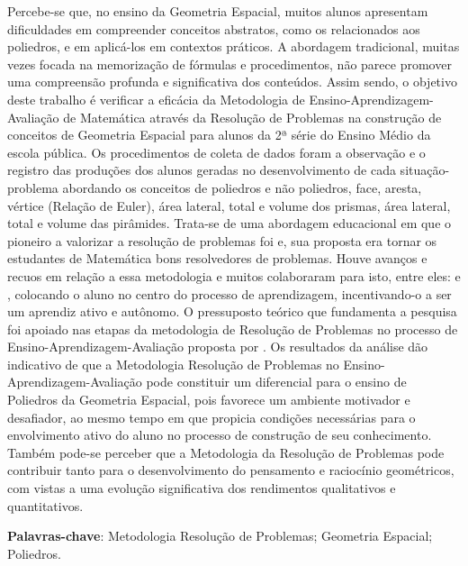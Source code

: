 
\setlength{\absparsep}{18pt} %
\begin{resumo}

	Percebe-se que, no ensino da Geometria Espacial, muitos alunos apresentam dificuldades em compreender conceitos abstratos, como os relacionados aos poliedros, e em aplicá-los em contextos práticos. A abordagem tradicional, muitas vezes focada na memorização de fórmulas e procedimentos, não parece promover uma compreensão profunda e significativa dos conteúdos. Assim sendo, o objetivo deste trabalho é verificar a eficácia da Metodologia de Ensino-Aprendizagem-Avaliação de Matemática através da Resolução de Problemas na construção de conceitos de Geometria Espacial para alunos da 2ª série do Ensino Médio da escola pública. Os procedimentos de coleta de dados foram a observação e o registro das produções dos alunos geradas no desenvolvimento de cada situação-problema abordando os conceitos de poliedros e não poliedros, face, aresta, vértice (Relação de Euler), área lateral, total e volume dos prismas, área lateral, total e volume das pirâmides. Trata-se de uma abordagem educacional em que o pioneiro a valorizar a resolução de problemas foi  e, sua proposta era tornar os estudantes de Matemática bons resolvedores de problemas. Houve avanços e recuos em relação a essa metodologia e muitos colaboraram para isto, entre eles:  e , colocando o aluno no centro do processo de aprendizagem, incentivando-o a ser um aprendiz ativo e autônomo. O pressuposto teórico que fundamenta a pesquisa foi apoiado nas etapas da metodologia de Resolução de Problemas no processo de Ensino-Aprendizagem-Avaliação proposta por . Os resultados da análise dão indicativo de que a Metodologia Resolução de Problemas no Ensino-Aprendizagem-Avaliação pode constituir um diferencial para o ensino de Poliedros da Geometria Espacial, pois favorece um ambiente motivador e desafiador, ao mesmo tempo em que propicia condições necessárias para o envolvimento ativo do aluno no processo de construção de seu conhecimento. Também pode-se perceber que a Metodologia da Resolução de Problemas pode contribuir tanto para o desenvolvimento do pensamento e raciocínio geométricos, com vistas a uma evolução significativa dos rendimentos qualitativos e quantitativos.

	\textbf{Palavras-chave}: Metodologia Resolução de Problemas; Geometria Espacial; Poliedros.

\end{resumo}
